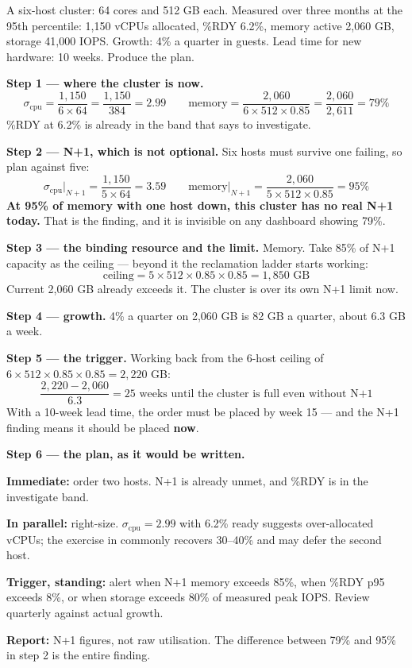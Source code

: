 \begin{worked}
A six-host cluster: 64 cores and 512 GB each. Measured over three months at the
95th percentile: 1{,}150 vCPUs allocated, \%RDY 6.2\%, memory active 2{,}060 GB,
storage 41{,}000 IOPS. Growth: 4\% a quarter in guests. Lead time for new
hardware: 10 weeks. Produce the plan.

\smallskip
\textbf{Step 1 --- where the cluster is now.}
\[ \sigma_{\text{cpu}} = \frac{1{,}150}{6 \times 64} = \frac{1{,}150}{384}
   = 2.99 \qquad
   \text{memory} = \frac{2{,}060}{6 \times 512 \times 0.85}
   = \frac{2{,}060}{2{,}611} = 79\% \]
\%RDY at 6.2\% is already in the band that  says to investigate.

\smallskip
\textbf{Step 2 --- N+1, which is not optional.} Six hosts must survive one
failing, so plan against five:
\[ \sigma_{\text{cpu}}\big|_{N+1} = \frac{1{,}150}{5 \times 64} = 3.59
   \qquad \text{memory}\big|_{N+1} = \frac{2{,}060}{5 \times 512 \times 0.85}
   = 95\% \]
\textbf{At 95\% of memory with one host down, this cluster has no real
N+1 today.} That is the finding, and it is invisible on any dashboard showing
79\%.

\smallskip
\textbf{Step 3 --- the binding resource and the limit.} Memory. Take 85\% of
N+1 capacity as the ceiling --- beyond it the reclamation ladder starts
working:
\[ \text{ceiling} = 5 \times 512 \times 0.85 \times 0.85 = 1{,}850 \text{ GB} \]
Current 2{,}060 GB already exceeds it. The cluster is over its own N+1 limit
now.

\smallskip
\textbf{Step 4 --- growth.} 4\% a quarter on 2{,}060 GB is 82 GB a quarter,
about 6.3 GB a week.

\smallskip
\textbf{Step 5 --- the trigger.} Working back from the 6-host ceiling of
$6 \times 512 \times 0.85 \times 0.85 = 2{,}220$ GB:
\[ \frac{2{,}220 - 2{,}060}{6.3} = 25 \text{ weeks until the cluster is full
   even without N+1} \]
With a 10-week lead time, the order must be placed by week 15 --- and the N+1
finding means it should be placed \textbf{now}.

\smallskip
\textbf{Step 6 --- the plan, as it would be written.}
\begin{tight}
  \item \textbf{Immediate:} order two hosts. N+1 is already unmet, and \%RDY is
        in the investigate band.
  \item \textbf{In parallel:} right-size. $\sigma_{\text{cpu}} = 2.99$ with
        6.2\% ready suggests over-allocated vCPUs; the exercise in
         commonly recovers 30--40\% and may defer the second
        host.
  \item \textbf{Trigger, standing:} alert when N+1 memory exceeds 85\%, when
        \%RDY p95 exceeds 8\%, or when storage exceeds 80\% of measured peak
        IOPS. Review quarterly against actual growth.
  \item \textbf{Report:} N+1 figures, not raw utilisation. The difference
        between 79\% and 95\% in step 2 is the entire finding.
\end{tight}
\end{worked}

